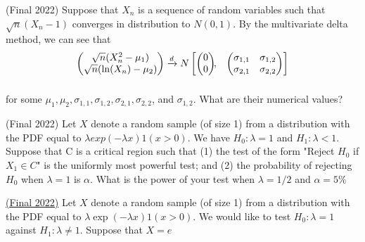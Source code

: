 \documentclass[answers]{exam}
\begin{document}
\begin{questions}
\question (Final 2022) Suppose that $X_n$ is a sequence of random variables such that $\sqrt{n}(X_n-1)$ converges in distribution to $N(0,1)$. By the multivariate delta method, we can see that
\begin{align*}
    \begin{pmatrix}
    \sqrt{n}(X_n^2-\mu_1)\\
    \sqrt{n}(\ln(X_n) - \mu_2)\\
    \end{pmatrix} 
    &\xrightarrow{d}  N
    \begin{bmatrix}
    \begin{pmatrix}
    0\\
    0
    \end{pmatrix}\!\!,&
    \begin{pmatrix}
    \sigma_{1,1} & \sigma_{1,2}\\
    \sigma_{2,1} & \sigma_{2,2}
    \end{pmatrix}
    \end{bmatrix}\\[2\jot]
    \end{align*}

for some $\mu_1, \mu_2, \sigma_{1,1}, \sigma_{1,2}, \sigma_{2,1}, \sigma_{2,2}$, and $\sigma_{1,2}$. What are their numerical values?
\begin{solution}
\end{solution}

\question (Final 2022) Let $X$ denote a random sample (of size 1) from a distribution with the PDF equal to $\lambda exp(-\lambda x) 1(x>0)$. We have $H_0 :\lambda = 1$ and $H_1 : \lambda < 1$. Suppose that C is a critical region such that (1) the test of the form "Reject $H_0$ if $X_1 \in C$" is the uniformly most powerful test; and (2) the probability of rejecting $H_0$ when $\lambda = 1$ is $\alpha$. What is the power of your test when $\lambda = 1/2$ and $\alpha = 5\%$
\begin{solution}
\end{solution}

\question \href{https://drive.google.com/drive/folders/1YOs26vcgyGiRhLpL4rkDJ6rVDJQ1RU2v}{(Final 2022)} Let $X$ denote a random sample (of size 1) from a distribution with the PDF equal to $\lambda \exp (-\lambda x)1(x>0)$. We would like to test $H_0 : \lambda = 1$ against $H_1 : \lambda \ne 1$. Suppose that $X=e$
\end{questions}
\end{document}
